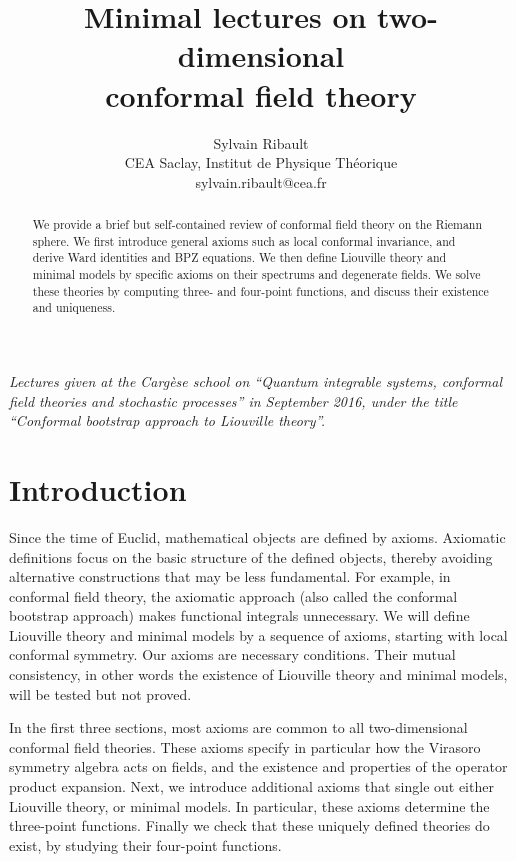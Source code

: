 \documentclass[12pt, a4paper]{article}
\title{\bfseries Minimal lectures on two-dimensional \\ conformal field theory}
\author{Sylvain Ribault \vspace{2mm}
\\
{\normalsize CEA Saclay, Institut de Physique Th\'eorique}
 \\
 {\footnotesize \ttfamily sylvain.ribault@cea.fr }
}
\theoremstyle{break}
\begin{document}
\maketitle


\begin{abstract}
We provide a brief but self-contained review of conformal field theory on the Riemann sphere. We first introduce general axioms such as local conformal invariance, and derive Ward identities and BPZ equations. We then define Liouville theory and minimal models by specific axioms on their spectrums and degenerate fields. We solve these theories by computing 
three- and four-point functions, and discuss their existence and uniqueness. 
\end{abstract}

\vspace{5mm}

 \noindent\textit{Lectures given at the Carg\`ese school on ``Quantum integrable systems, conformal field theories and stochastic processes'' in September 2016, under the title ``Conformal bootstrap approach to Liouville theory''.}



\clearpage

\tableofcontents

\hypersetup{linkcolor=blue}

\setcounter{section}{-1}

\section{Introduction}

Since the time of Euclid, mathematical objects are defined by axioms. 
Axiomatic definitions focus on the basic structure of the defined objects, thereby avoiding alternative constructions that may be less fundamental.
For example, in conformal field theory, the axiomatic approach (also called the conformal bootstrap approach) makes functional integrals unnecessary.
We will define Liouville theory and minimal models by a sequence of axioms, starting with local conformal symmetry. 
Our axioms are necessary conditions. 
Their mutual consistency, in other words the existence of Liouville theory and minimal models, will be tested but not proved.

In the first three sections, most axioms are common to all two-dimensional conformal field theories.
These axioms specify in particular how the Virasoro symmetry algebra acts on fields, and the existence and properties of the operator product expansion. 
Next, we introduce additional axioms that single out either Liouville theory, or minimal models.
In particular, these axioms determine the three-point functions. 
Finally we check that these uniquely defined theories do exist, by studying their four-point functions.
\end{document}

